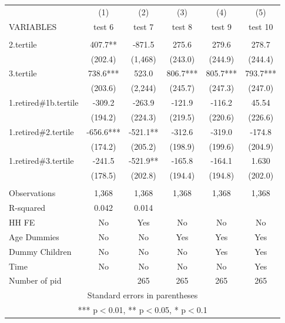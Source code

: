 \begin{tabular}{lccccc} \hline
 & (1) & (2) & (3) & (4) & (5) \\
VARIABLES & test 6 & test 7 & test 8 & test 9 & test 10 \\ \hline
 &  &  &  &  &  \\
2.tertile & 407.7** & -871.5 & 275.6 & 279.6 & 278.7 \\
 & (202.4) & (1,468) & (243.0) & (244.9) & (244.4) \\
3.tertile & 738.6*** & 523.0 & 806.7*** & 805.7*** & 793.7*** \\
 & (203.6) & (2,244) & (245.7) & (247.3) & (247.0) \\
1.retired\#1b.tertile & -309.2 & -263.9 & -121.9 & -116.2 & 45.54 \\
 & (194.2) & (224.3) & (219.5) & (220.6) & (226.6) \\
1.retired\#2.tertile & -656.6*** & -521.1** & -312.6 & -319.0 & -174.8 \\
 & (174.2) & (205.2) & (198.9) & (199.6) & (204.9) \\
1.retired\#3.tertile & -241.5 & -521.9** & -165.8 & -164.1 & 1.630 \\
 & (178.5) & (202.8) & (194.4) & (194.8) & (202.0) \\
 &  &  &  &  &  \\
Observations & 1,368 & 1,368 & 1,368 & 1,368 & 1,368 \\
R-squared & 0.042 & 0.014 &  &  &  \\
HH FE & No & Yes & No & No & No \\
Age Dummies & No & No & Yes & Yes & Yes \\
Dummy Children & No & No & No & Yes & Yes \\
Time & No & No & No & No & Yes \\
 Number of pid &  & 265 & 265 & 265 & 265 \\ \hline
\multicolumn{6}{c}{ Standard errors in parentheses} \\
\multicolumn{6}{c}{ *** p$<$0.01, ** p$<$0.05, * p$<$0.1} \\
\end{tabular}
